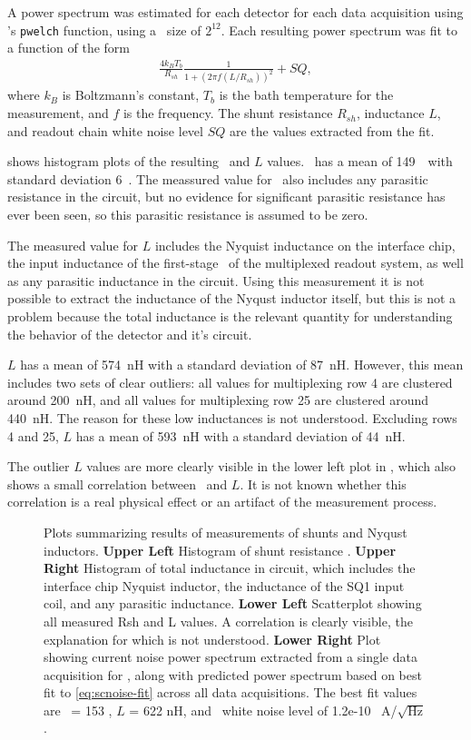 A power spectrum was estimated for each detector for each data acquisition using \MATLAB's \texttt{pwelch} function, using a \FFT\ size of $2^{12}$.
Each resulting power spectrum was fit to a function of the form
\begin{eqnarray}\label{eq:scnoise-fit}
	\frac{4 k_B T_b}{R_{sh}} \frac{1}{1 + (2 \pi f (L/R_{sh}))^2} + SQ,
\end{eqnarray}
where $k_B$ is Boltzmann's constant, $T_b$ is the bath temperature for the measurement, and $f$ is the frequency.
The shunt resistance $R_{sh}$, inductance $L$, and readout chain white noise level $SQ$ are the values extracted from the fit.

 shows histogram plots of the resulting \Rsh\ and $L$ values.
\Rsh\ has a mean of 149~\uOhm\ with standard deviation 6~\uOhm.
The meassured value for \Rsh\ also includes any parasitic resistance in the circuit, but no evidence for significant parasitic resistance has ever been seen, so this parasitic resistance is assumed to be zero.

The measured value for $L$ includes the Nyquist inductance on the interface chip, the input inductance of the first-stage \SQUID\ of the multiplexed readout system, as well as any parasitic inductance in the circuit.
Using this measurement it is not possible to extract the inductance of the Nyqust inductor itself, but this is not a problem because the total inductance is the relevant  quantity for understanding the behavior of the detector and it's circuit.

$L$ has a mean of 574~nH with a standard deviation of 87~nH.
However, this mean includes two sets of clear outliers: all values for multiplexing row 4 are clustered around 200~nH, and all values for multiplexing row 25 are clustered around 440~nH.
The reason for these low inductances is not understood.
Excluding rows 4 and 25,  $L$ has a mean of 593~nH with a standard deviation of 44~nH.

The outlier $L$ values are more clearly visible in the lower left plot in , which also shows a small correlation between \Rsh\ and $L$.
It is not known whether this correlation is a real physical effect or an artifact of the measurement process.

\begin{figure*}

\caption{Plots summarizing results of measurements of shunts and Nyqust inductors.
\textbf{Upper Left} Histogram of shunt resistance \Rsh.
\textbf{Upper Right} Histogram of total inductance in circuit, which includes the interface chip Nyquist inductor, the inductance of the SQ1 input coil, and any parasitic inductance.
\textbf{Lower Left} Scatterplot showing all measured Rsh and L values. A correlation is clearly visible, the explanation for which is not understood.
\textbf{Lower Right} Plot showing current noise power spectrum extracted from a single data acquisition for , along with predicted power spectrum based on best fit to \eqref{eq:scnoise-fit} across all data acquisitions. The best fit values are \Rsh\ = 153 \uOhm, $L$ = 622 nH, and \SQUID\ white noise level of 1.2e-10~ A/$\sqrt{\mbox{Hz}}$.}
\label{fig:rsh-l-plots}
\end{figure*}

